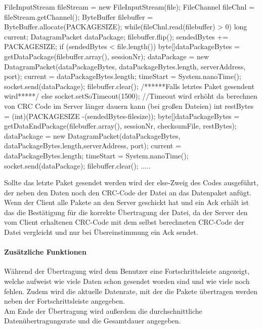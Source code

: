 \documentclass[a4paper, 12pt]{scrartcl}
\begin{document}
\begin{javacode}
FileInputStream fileStream = new FileInputStream(file);
FileChannel fileChnl = fileStream.getChannel();
ByteBuffer filebuffer = ByteBuffer.allocate(PACKAGESIZE); 
while(fileChnl.read(filebuffer) > 0)
{
	long current;
	DatagramPacket dataPackage;
	filebuffer.flip();
	sendedBytes += PACKAGESIZE;
	if (sendedBytes < file.length())
	{
		byte[]dataPackageBytes = getDataPackage(filebuffer.array(), sessionNr);
		dataPackage = 
			new DatagramPacket(dataPackageBytes, dataPackageBytes.length, serverAddress, port);
		current = dataPackageBytes.length;
		timeStart = System.nanoTime();
		socket.send(dataPackage);
		filebuffer.clear();
	}
	/******Falls letztes Paket gesendent wird*****/
	else
	{
		socket.setSoTimeout(1500); //Timeout wird erhöht da berechnen von CRC Code im Server länger dauern kann (bei großen Dateien)
		int restBytes = (int)(PACKAGESIZE -(sendedBytes-filesize));
		byte[]dataPackageBytes = 
			getDataEndPackage(filebuffer.array(), 
			sessionNr, checksumFile, restBytes);
		dataPackage = 
			new DatagramPacket(dataPackageBytes, 
			dataPackageBytes.length,serverAddress, port);
		current = dataPackageBytes.length;
		timeStart = System.nanoTime();
		socket.send(dataPackage);
		filebuffer.clear();
	}
	.....
}
\end{javacode} 
Sollte das letzte Paket gesendet werden wird der else-Zweig des Codes ausgeführt, der neben den Daten noch den CRC-Code der Datei an das Datenpaket anfügt.\\
Wenn der Client alle Pakete an den Server geschickt hat und ein Ack erhält ist das die Bestätigung für die korrekte Übertragung der Datei, da der Server den vom Client erhaltenen CRC-Code mit dem selbst berechneten CRC-Code der Datei vergleicht und nur bei Übereinstimmung ein Ack sendet.
\paragraph{Zusätzliche Funktionen}
Während der Übertragung wird dem Benutzer eine Fortschrittsleiste angezeigt, welche aufweist wie viele Daten schon gesendet worden sind und wie viele noch fehlen. Zudem wird die aktuelle Datenrate, mit der die Pakete übertragen werden neben der Fortschrittsleiste angegeben.\\
Am Ende der Übertragung wird außerdem die durchschnittliche Datenübertragungsrate und die Gesamtdauer angegeben.
\end{document}
